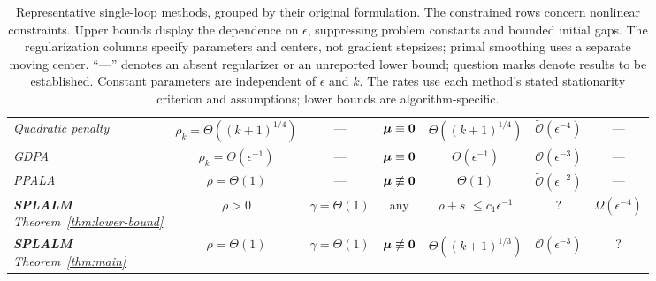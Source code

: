 \begin{table}[tp]
\begin{threeparttable}
\begin{tabular}{@{}lcccccc@{}}
\makecell[l]{\emph{Quadratic penalty}\\\cite{alacaoglu2024complexity}}
 & $\rho_k=\Theta((k+1)^{1/4})$ & ---
 & $\bm{\mu}\equiv\mathbf 0$ & $\Theta((k+1)^{1/4})$
 & $\widetilde{\mathcal O}(\epsilon^{-4})$ & --- \\[3pt]
\makecell[l]{\emph{GDPA}\\\cite{luSingleLoopGradientDescent2022}}
 & $\rho_k=\Theta(\epsilon^{-1})$
 & ---
 & $\bm{\mu}\equiv\mathbf 0$ & $\Theta(\epsilon^{-1})$
 & $\mathcal O(\epsilon^{-3})$ & --- \\[3pt]
\makecell[l]{\emph{PPALA}\\\cite{kim2024fast}}
 & $\rho=\Theta(1)$ & ---
 & $\bm{\mu}\not\equiv\mathbf 0$ & $\Theta(1)$
 & $\widetilde{\mathcal O}(\epsilon^{-2})$ & --- \\[3pt]
 \midrule
\makecell[l]{\textbf{\emph{SPLALM}}\\\emph{Theorem~\ref{thm:lower-bound}}}
 & $\rho>0$ & $\gamma=\Theta(1)$
 & any & \makecell{$\rho+s$\\$\le c_1\epsilon^{-1}$}
 & ? & $\Omega(\epsilon^{-4})$ \\[3pt]
\makecell[l]{\textbf{\emph{SPLALM}}\\\emph{Theorem~\ref{thm:main}}}
 & $\rho=\Theta(1)$ & $\gamma=\Theta(1)$
 & $\bm{\mu}\not\equiv\mathbf 0$ & $\Theta((k+1)^{1/3})$
 & $\mathcal O(\epsilon^{-3})$ & ? \\
\bottomrule
\end{tabular}
\caption{Representative single-loop methods, grouped by their original
formulation. The constrained rows concern nonlinear constraints. Upper bounds display the dependence on $\epsilon$, suppressing
problem constants and bounded initial gaps. The regularization columns specify parameters and centers, not gradient
stepsizes; primal smoothing uses a separate
moving center. ``---'' denotes an absent regularizer or an unreported lower
bound; question marks denote results to be established. Constant parameters
are independent of $\epsilon$ and $k$. The rates use each method's stated
stationarity criterion and assumptions; lower bounds are algorithm-specific.}
\label{tab:known-results}
\end{threeparttable}
\end{table}
\clearpage


